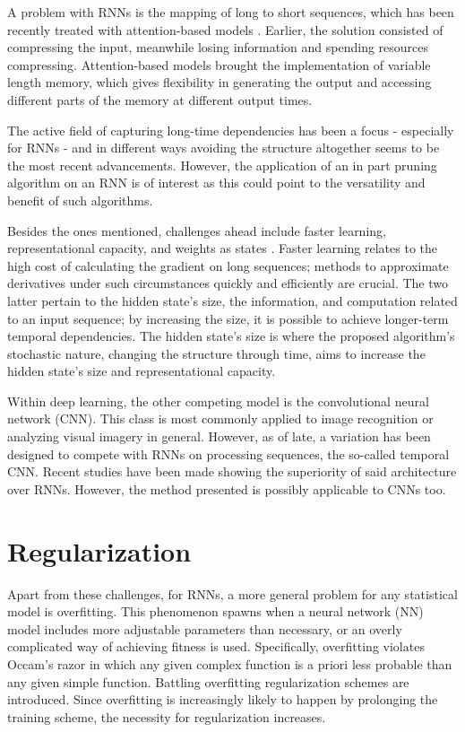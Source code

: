 A problem with RNNs is the mapping of long to short sequences, which has been recently treated with attention-based models \cite{xu}. Earlier, the solution consisted of compressing the input, meanwhile losing information and spending resources compressing. Attention-based models brought the implementation of variable length memory, which gives flexibility in generating the output and accessing different parts of the memory at different output times. 

The active field of capturing long-time dependencies has been a focus - especially for RNNs - and in different ways avoiding the structure altogether seems to be the most recent advancements. However, the application of an in part pruning algorithm on an RNN is of interest as this could point to the versatility and benefit of such algorithms.

Besides the ones mentioned, challenges ahead include faster learning, representational capacity, and weights as states \cite{suts}. Faster learning relates to the high cost of calculating the gradient on long sequences; methods to approximate derivatives under such circumstances quickly and efficiently are crucial. The two latter pertain to the hidden state's size, the information, and computation related to an input sequence; by increasing the size, it is possible to achieve longer-term temporal dependencies. The hidden state's size is where the proposed algorithm's stochastic nature, changing the structure through time, aims to increase the hidden state's size and representational capacity.

Within deep learning, the other competing model is the convolutional neural network (CNN). This class is most commonly applied to image recognition or analyzing visual imagery in general. However, as of late, a variation has been designed to compete with RNNs on processing sequences, the so-called temporal CNN. Recent studies have been made showing the superiority of said architecture over RNNs\cite{tcnvsrnn}. However, the method presented is possibly applicable to CNNs too.

\section{Regularization}

Apart from these challenges, for RNNs, a more general problem for any statistical model is overfitting. This phenomenon spawns when a neural network (NN) model includes more adjustable parameters than necessary, or an overly complicated way of achieving fitness is used. Specifically, overfitting violates Occam's razor in which any given complex function is a priori less probable than any given simple function. Battling overfitting regularization schemes are introduced. Since overfitting is increasingly likely to happen by prolonging the training scheme, the necessity for regularization increases.

